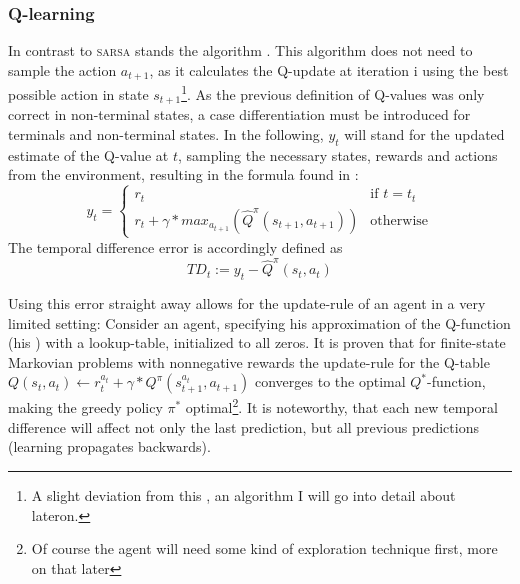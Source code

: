 \subsubsection{Q-learning}

In contrast to \textsc{sarsa} stands the  algorithm . This algorithm does not need to sample the action $a_{t+1}$, as it calculates the Q-update at iteration i using the best possible action in state $s_{t+1}$\footnote{A slight deviation from this , an algorithm I will go into detail about lateron.}. As the previous definition of Q-values was only correct in non-terminal states, a case differentiation must be introduced for terminals and non-terminal states. In the following, $y_t$ will stand for the updated estimate of the Q-value at $t$, sampling the necessary states, rewards and actions from the environment, resulting in the formula found in \cite{mnih_human-level_2015}:
\begin{equation}
y_{t} = \begin{cases}
r_t & \text{if } t = t_t\\
r_t + \gamma * max_{a_{t+1}} (\hat{Q}^\pi( s_{t+1}, a_{t+1})) & \text{otherwise}
\end{cases}
\end{equation}
The temporal difference error is accordingly defined as 
\begin{equation}
TD_t := y_t - \hat{Q}^\pi(s_t, a_t)
\end{equation}

Using this error straight away allows for the update-rule of an agent in a very limited setting: Consider an agent, specifying his approximation of the Q-function (his ) with a lookup-table, initialized to all zeros. It is proven that for finite-state Markovian problems with nonnegative rewards the update-rule for the Q-table \mbox{$Q(s_t,a_t) \leftarrow r_t^{a_t} + \gamma * Q^\pi(s_{t+1}^{a_t},a_{t+1}) $} converges to the optimal $Q^*$-function, making the greedy policy $\pi^*$ optimal\footnote{Of course the agent will need some kind of exploration technique first, more on that later}. It is noteworthy, that each new temporal difference will affect not only the last prediction, but all previous predictions (learning propagates backwards).

